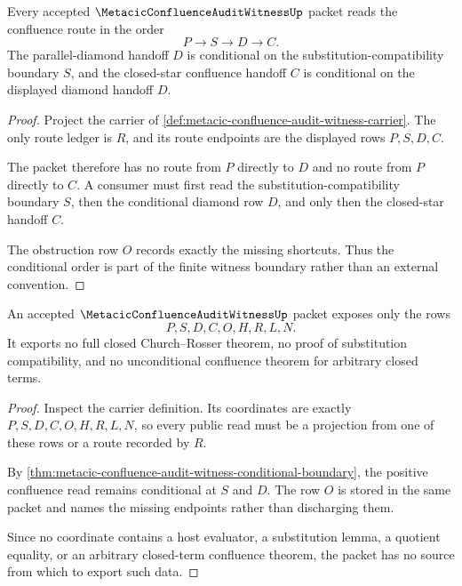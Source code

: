 \begin{theorem}
\label{thm:metacic-confluence-audit-witness-conditional-boundary}
Every accepted $\MetacicConfluenceAuditWitnessUp$ packet reads the confluence route in the order
$$
P \longrightarrow S \longrightarrow D \longrightarrow C.
$$
The parallel-diamond handoff $D$ is conditional on the substitution-compatibility boundary $S$, and the closed-star confluence handoff $C$ is conditional on the displayed diamond handoff $D$.
\end{theorem}
\begin{proof}
Project the carrier of \autoref{def:metacic-confluence-audit-witness-carrier}. The only route ledger is $R$, and its route endpoints are the displayed rows $P,S,D,C$.

The packet therefore has no route from $P$ directly to $D$ and no route from $P$ directly to $C$. A consumer must first read the substitution-compatibility boundary $S$, then the conditional diamond row $D$, and only then the closed-star handoff $C$.

The obstruction row $O$ records exactly the missing shortcuts. Thus the conditional order is part of the finite witness boundary rather than an external convention.
\end{proof}

\begin{theorem}
\label{thm:metacic-confluence-audit-witness-nonescape}
An accepted $\MetacicConfluenceAuditWitnessUp$ packet exposes only the rows
$$
P,S,D,C,O,H,R,L,N.
$$
It exports no full closed Church--Rosser theorem, no proof of substitution compatibility, and no unconditional confluence theorem for arbitrary closed terms.
\end{theorem}
\begin{proof}
Inspect the carrier definition. Its coordinates are exactly $P,S,D,C,O,H,R,L,N$, so every public read must be a projection from one of these rows or a route recorded by $R$.

By \autoref{thm:metacic-confluence-audit-witness-conditional-boundary}, the positive confluence read remains conditional at $S$ and $D$. The row $O$ is stored in the same packet and names the missing endpoints rather than discharging them.

Since no coordinate contains a host evaluator, a substitution lemma, a quotient equality, or an arbitrary closed-term confluence theorem, the packet has no source from which to export such data.
\end{proof}

